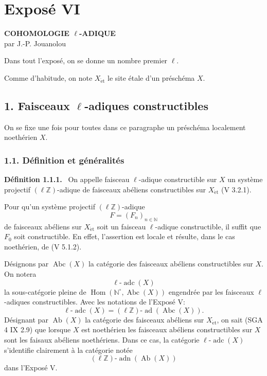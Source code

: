 \documentclass[11pt]{article}
\newenvironment{statement}[1]{\par\medskip\noindent\textbf{#1.}\ }{\par\medskip}
\DeclareMathOperator{\Hom}{Hom}
\providecommand{\Hom}{\operatorname{Hom}}
\providecommand{\adn}{\operatorname{adn}}
\providecommand{\Ab}{\operatorname{Ab}}
\providecommand{\Abc}{\operatorname{Abc}}
\providecommand{\adc}{\operatorname{adc}}
\providecommand{\ad}{\operatorname{ad}}
\providecommand{\adn}{\operatorname{adn}}
\providecommand{\Ab}{\operatorname{Ab}}
\providecommand{\Hom}{\operatorname{Hom}}
\begin{document}
\section*{Exposé VI}

\begin{center}
\textbf{COHOMOLOGIE \(\ell\)-ADIQUE}\\[0.5em]
par J.-P. Jouanolou
\end{center}

Dans tout l'exposé, on se donne un nombre premier \(\ell\).

Comme d'habitude, on note \(X_{\mathrm{\acute et}}\) le site étale d'un préschéma \(X\).

\subsection*{1. Faisceaux \(\ell\)-adiques constructibles}

On se fixe une fois pour toutes dans ce paragraphe un préschéma localement noethérien \(X\).

\subsubsection*{1.1. Définition et généralités}

\begin{statement}{Définition 1.1.1}
On appelle faisceau \(\ell\)-adique constructible sur \(X\) un système projectif \((\ell\mathbb Z)\)-adique de faisceaux abéliens constructibles sur \(X_{\mathrm{\acute et}}\) (V 3.2.1).
\end{statement}

Pour qu'un système projectif \((\ell\mathbb Z)\)-adique
\[
F=(F_n)_{n\in\mathbb N}
\]
de faisceaux abéliens sur \(X_{\mathrm{\acute et}}\) soit un faisceau \(\ell\)-adique constructible, il suffit que \(F_0\) soit constructible. En effet, l'assertion est locale et résulte, dans le cas noethérien, de (V 5.1.2).

Désignons par \(\Abc(X)\) la catégorie des faisceaux abéliens constructibles sur \(X\). On notera
\[
\ell\text{-}\adc(X)
\]
la sous-catégorie pleine de \(\Hom(\mathbb N^{\circ},\Abc(X))\) engendrée par les faisceaux \(\ell\)-adiques constructibles. Avec les notations de l'Exposé V:
\[
\ell\text{-}\adc(X)=(\ell\mathbb Z)\text{-}\ad(\Abc(X)).
\]
Désignant par \(\Ab(X)\) la catégorie des faisceaux abéliens sur \(X_{\mathrm{\acute et}}\), on sait (SGA 4 IX 2.9) que lorsque \(X\) est noethérien les faisceaux abéliens constructibles sur \(X\) sont les faisaux abéliens noethériens. Dans ce cas, la catégorie \(\ell\text{-}\adc(X)\) s'identifie clairement à la catégorie notée
\[
(\ell\mathbb Z)\text{-}\adn(\Ab(X))
\]
dans l'Exposé V.
\end{document}
